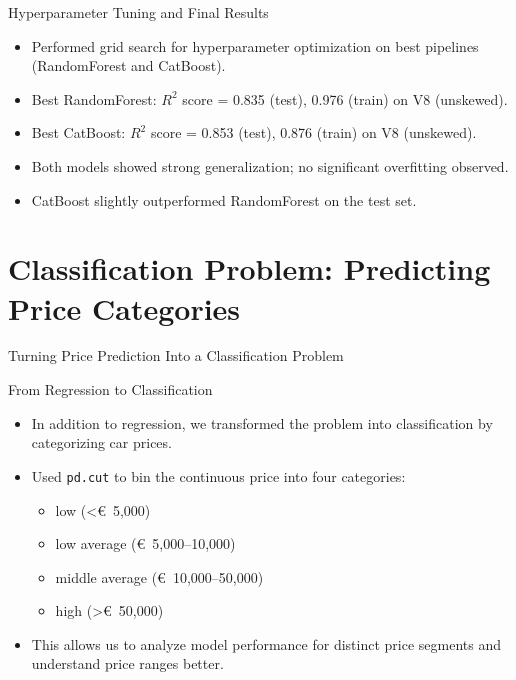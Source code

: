 \documentclass{beamer}
\begin{document}
\begin{frame}{Hyperparameter Tuning and Final Results}
        \begin{itemize}
                \item Performed grid search for hyperparameter optimization on
                        best pipelines (RandomForest and CatBoost).
                \item Best RandomForest: $R^2$ score = 0.835 (test), 0.976
                        (train) on V8 (unskewed).
                \item Best CatBoost: $R^2$ score = 0.853 (test), 0.876 (train)
                        on V8 (unskewed).
                \item Both models showed strong generalization; no significant
                        overfitting observed.
                \item CatBoost slightly outperformed RandomForest on the test
                        set.
        \end{itemize}
\end{frame}

\section{Classification Problem: Predicting Price Categories}
\begin{frame}
        \centering
        \Huge
        Turning Price Prediction Into a Classification Problem
\end{frame}


\begin{frame}{From Regression to Classification}
        \begin{itemize}
                \item In addition to regression, we transformed the problem
                        into classification by categorizing car prices.
                \item Used \texttt{pd.cut} to bin the continuous price into
                        four categories:
                        \begin{itemize}
                                \item low (\textless €~5,000)
                                \item low average (€~5,000–10,000)
                                \item middle average (€~10,000–50,000)
                                \item high (\textgreater €~50,000)
                        \end{itemize}
                \item This allows us to analyze model performance for distinct
                        price segments and understand price ranges better.
        \end{itemize}
\end{frame}
\end{document}
